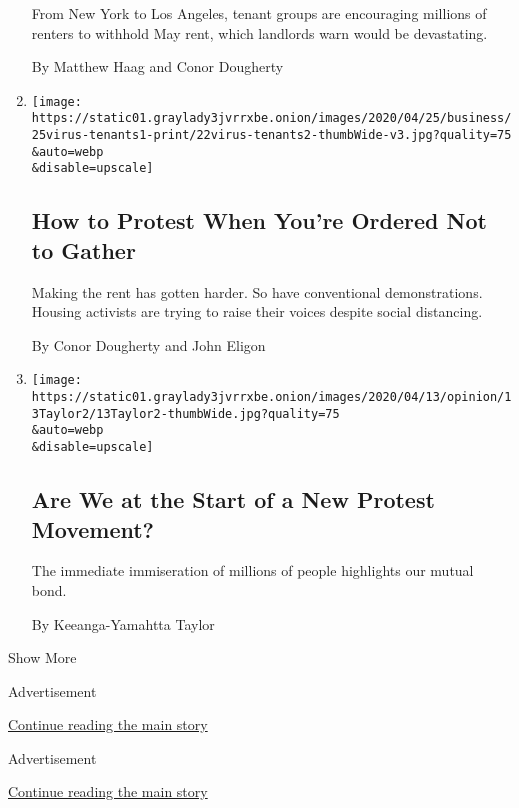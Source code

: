 \begin{enumerate}
  From New York to Los Angeles, tenant groups are encouraging millions
  of renters to withhold May rent, which landlords warn would be
  devastating.

  By Matthew Haag and Conor Dougherty
\item
  \href{/2020/04/23/business/economy/coronavirus-tenants-rent-protests.html}{}

  \texttt{[image: https://static01.graylady3jvrrxbe.onion/images/2020/04/25/business/25virus-tenants1-print/22virus-tenants2-thumbWide-v3.jpg?quality=75\\\&auto=webp\\\&disable=upscale]}

  \hypertarget{how-to-protest-when-youre-ordered-not-to-gather}{%
  \subsection{How to Protest When You're Ordered Not to
  Gather}\label{how-to-protest-when-youre-ordered-not-to-gather}}

  Making the rent has gotten harder. So have conventional
  demonstrations. Housing activists are trying to raise their voices
  despite social distancing.

  By Conor Dougherty and John Eligon
\item
  \href{/2020/04/13/opinion/protest-social-distancing-covid.html}{}

  \texttt{[image: https://static01.graylady3jvrrxbe.onion/images/2020/04/13/opinion/13Taylor2/13Taylor2-thumbWide.jpg?quality=75\\\&auto=webp\\\&disable=upscale]}

  \hypertarget{are-we-at-the-start-of-a-new-protest-movement}{%
  \subsection{Are We at the Start of a New Protest
  Movement?}\label{are-we-at-the-start-of-a-new-protest-movement}}

  The immediate immiseration of millions of people highlights our mutual
  bond.

  By Keeanga-Yamahtta Taylor
\end{enumerate}

Show More

Advertisement

\protect\hyperlink{after-mid1}{Continue reading the main story}

Advertisement

\protect\hyperlink{after-mktg}{Continue reading the main story}

